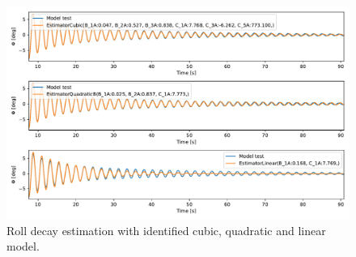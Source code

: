 \begin{figure}[H]
    \centering
    \includegraphics[width=\linewidth]{kappa/images/roll_decay_model_compare.pdf}
    \caption{Roll decay estimation with identified cubic, quadratic and linear model.}
    \label{fig:roll_decay_compare}
\end{figure}

